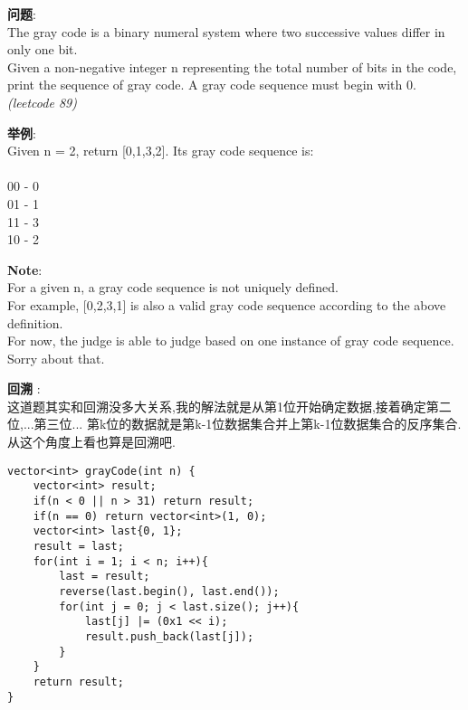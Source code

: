     
\begin{description}
    \item{\textbf{问题}}:\\
The gray code is a binary numeral system where two successive values differ in only one bit.\\
Given a non-negative integer n representing the total number of bits in the code, print the sequence of gray code. A gray code sequence must begin with 0.\\
\textit{(leetcode 89)}
    \item{\textbf{举例}}:\\
Given n = 2, return [0,1,3,2]. Its gray code sequence is:\\
\\
00 - 0\\
01 - 1\\
11 - 3\\
10 - 2
    \item{\textbf{Note}}:\\
For a given n, a gray code sequence is not uniquely defined.\\
For example, [0,2,3,1] is also a valid gray code sequence according to the above definition.\\
For now, the judge is able to judge based on one instance of gray code sequence. Sorry about that.
    \item{\textbf{回溯}} : 
    \\这道题其实和回溯没多大关系,我的解法就是从第1位开始确定数据,接着确定第二位,...第三位... 第k位的数据就是第k-1位数据集合并上第k-1位数据集合的反序集合.从这个角度上看也算是回溯吧.
    \begin{lstlisting}
vector<int> grayCode(int n) {
	vector<int> result;
	if(n < 0 || n > 31)	return result;
	if(n == 0) return vector<int>(1, 0);
	vector<int> last{0, 1};
	result = last;
	for(int i = 1; i < n; i++){
		last = result;
		reverse(last.begin(), last.end());
		for(int j = 0; j < last.size(); j++){
			last[j] |= (0x1 << i);
			result.push_back(last[j]);
		}
	}
	return result;
}
    \end{lstlisting}
\end{description}
